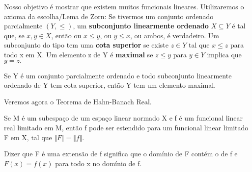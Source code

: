 \documentclass[measure_theory.tex]{subfiles}
\begin{document}
Nosso objetivo é mostrar que existem muitos funcionais lineares. Utilizaremos o axioma da escolha/Lema de Zorn: Se tivermos um conjunto ordenado parcialmente \((Y, \leq )\), um \textbf{subconjunto linearmente ordenado} \(X\subseteq Y\) é tal que, se \(x, y\in X\), então ou \(x\leq y\), ou \(y \leq x\), ou ambos, é verdadeiro.
Um subconjunto do tipo tem uma \textbf{cota superior} se existe \(z\in Y\) tal que \(x\leq z\) para todo x em X.  Um elemento z de Y é \textbf{maximal} se \(z \leq y\) para \(y\in Y\) implica que \(y = z.\)
\hypertarget{zornn}{
	\begin{lemma*}
		Se Y é um conjunto parcialmente ordenado e todo subconjunto linearmente ordenado de Y tem cota superior, então Y tem um elemento maximal.
	\end{lemma*}
}
Veremos agora o Teorema de Hahn-Banach Real.
\hypertarget{real_hahn_banach}{
	\begin{theorem*}
		Se M é um subespaço de um espaço linear normado X e f é um funcional linear real limitado em M, então f pode ser estendido para um funcional linear limitado F em X, tal que \(\Vert F \Vert = \Vert f \Vert.\)
	\end{theorem*}
}
Dizer que F é uma extensão de f significa que o domínio de F contém o de f e \(F(x) = f(x)\) para todo x no domínio de f.
\end{document}
